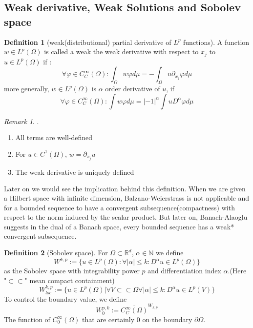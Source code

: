 \documentclass[a4paper,11pt,oneside,fleqn]{book}
\theoremstyle{definition}
\newtheorem{definition}{Definition}[section]
\theoremstyle{remark}
\newtheorem*{remark}{Remark}
\begin{document}
\subsection{Weak derivative, Weak Solutions and Sobolev space}
\begin{definition}[weak(distributional) partial derivative of $L^p$ functions]
	A function $w \in L^p(\Omega)$ is called a weak the weak derivative with respect to $x_j$ to $u \in L^p(\Omega)$ if :
	\begin{equation*}
		\forall \varphi \in C^\infty_C(\Omega): \int_\Omega w \varphi d\mu = -\int_\Omega u \partial_{x_j} \varphi d\mu  
	\end{equation*}
	more generally, $w \in L^p(\Omega)$ is $\alpha$ order derivative of $u$, if
	\begin{equation*}
		\forall \varphi \in C^\infty_C(\Omega): \int w \varphi d\mu = |-1|^\alpha \int u D^\alpha \varphi d\mu
	\end{equation*}
\end{definition}

\begin{remark}.
\begin{enumerate}
	\item All terms are well-defined
	\item For $u \in C^1(\Omega)$, $w = \partial_{x_j} u$
	\item The weak derivative is uniquely defined
\end{enumerate}	
\end{remark}

Later on we would see the implication behind this definition. When we are given a Hilbert space with infinite dimension, Balzano-Weierstrass is not applicable and for a bounded sequence to have a convergent subsequence(compactness) with respect to the norm induced by the scalar product. But later on, Banach-Alaoglu suggests in the dual of a Banach space, every bounded sequence has a weak* convergent subsequence.

\begin{definition}[Sobolev space]
For $\Omega \subset \mathbb{R}^d$, $\alpha \in \mathbb{N}$ we define
\begin{equation*}
	W^{k, p}:= \{u \in L^p(\Omega): \forall |\alpha| \leq k: D^\alpha u \in L^p(\Omega)\}
\end{equation*}
as the Sobolev space with integrability power $p$ and differentiation index $\alpha$.(Here "$\subset \subset$" mean compact containment)
\begin{equation*}
	W^{k, p}_{loc}:= \{ u \in L^p(\Omega)| \forall V \subset \subset \Omega \forall |\alpha| \leq k  :D^\alpha u \in L^p(V) \}
\end{equation*} 
To control the boundary value, we define
\begin{equation*}
	W_0^{p, k}:= \overline{ C_C^\infty(\Omega)}^{W_{k, p}}
\end{equation*}
	The function of $C^\infty_0(\Omega)$ that are certainly 0 on the boundary $\partial \Omega$.
\end{definition}
\end{document}
